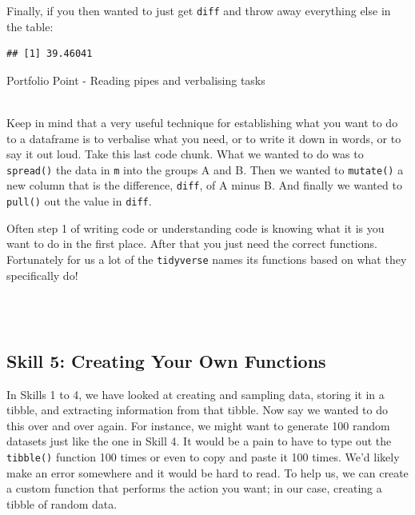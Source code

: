 \documentclass[]{book}
\newenvironment{Shaded}{\begin{snugshade}}{\end{snugshade}}
\newcommand{\DataTypeTok}[1]{\textcolor[rgb]{0.13,0.29,0.53}{#1}}
\newcommand{\KeywordTok}[1]{\textcolor[rgb]{0.13,0.29,0.53}{\textbf{#1}}}
\newcommand{\NormalTok}[1]{#1}
\newcommand{\OperatorTok}[1]{\textcolor[rgb]{0.81,0.36,0.00}{\textbf{#1}}}
\newcommand{\StringTok}[1]{\textcolor[rgb]{0.31,0.60,0.02}{#1}}
\newenvironment{info}
    {
    \hline\\
    }
    { 
    \\\\\hline
    }
\begin{document}
Finally, if you then wanted to just get \texttt{diff} and throw away everything else in the table:

\begin{Shaded}
\end{Shaded}

\begin{verbatim}
## [1] 39.46041
\end{verbatim}

Portfolio Point - Reading pipes and verbalising tasks

\begin{info}
Keep in mind that a very useful technique for establishing what you want
to do to a dataframe is to verbalise what you need, or to write it down
in words, or to say it out loud. Take this last code chunk. What we
wanted to do was to \texttt{spread()} the data in \texttt{m} into the
groups A and B. Then we wanted to \texttt{mutate()} a new column that is
the difference, \texttt{diff}, of A minus B. And finally we wanted to
\texttt{pull()} out the value in \texttt{diff}.

Often step 1 of writing code or understanding code is knowing what it is
you want to do in the first place. After that you just need the correct
functions. Fortunately for us a lot of the \texttt{tidyverse} names its
functions based on what they specifically do!
\end{info}

\hypertarget{skill-5-creating-your-own-functions}{%
\subsection{Skill 5: Creating Your Own Functions}\label{skill-5-creating-your-own-functions}}

In Skills 1 to 4, we have looked at creating and sampling data, storing it in a tibble, and extracting information from that tibble. Now say we wanted to do this over and over again. For instance, we might want to generate 100 random datasets just like the one in Skill 4. It would be a pain to have to type out the \texttt{tibble()} function 100 times or even to copy and paste it 100 times. We'd likely make an error somewhere and it would be hard to read. To help us, we can create a custom function that performs the action you want; in our case, creating a tibble of random data.
\end{document}
